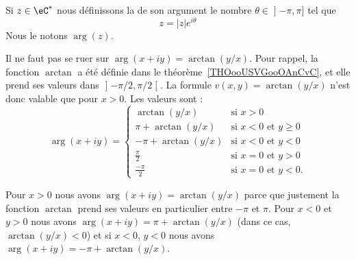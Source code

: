 \begin{definition}
	Si \( z\in \eC^*\) nous définissons la  de son argument le nombre \( \theta\in \mathopen] -\pi , \pi \mathclose]\) tel que
	\begin{equation}
		z=| z | e^{i\theta}
	\end{equation}
	Nous le notons \( \arg(z)\).
\end{definition}

\begin{normaltext}      \label{NORMooOGHNooYriCBH}
	Il ne faut pas se ruer sur \( \arg(x+iy)=\arctan(y/x)\). Pour rappel, la fonction \( \arctan\) a été définie dans le théorème~\ref{THOooUSVGooOAnCvC}, et elle prend ses valeurs dans \( \mathopen] -\pi/2 , \pi/2 \mathclose[\). La formule \( v(x,y)=\arctan(y/x)\) n'est donc valable que pour \( x>0\). Les valeurs sont :
	\begin{equation}        \label{EQooPJVFooSEKTny}
		\arg(x+iy)=\begin{cases}
			\arctan(y/x)       & \text{si } x>0                   \\
			\pi+\arctan(y/x)   & \text{si } x<0\text{ et }y\geq 0 \\
			-\pi+\arctan(y/x)  & \text{si } x<0 \text{ et }y<0    \\
			\frac{ \pi }{ 2 }  & \text{si } x=0 \text{ et }y>0    \\
			\frac{- \pi }{ 2 } & \text{si } x=0 \text{ et }y<0.
		\end{cases}
	\end{equation}

	Pour \( x>0\) nous avons \( \arg(x+iy)=\arctan(y/x)  \) parce que justement la fonction \( \arctan\) prend ses valeurs en particulier entre \( -\pi\) et \( \pi\). Pour \( x<0\) et \( y>0 \) nous avons \( \arg(x+iy)=\pi+\arctan(y/x)\) (dans ce cas, \( \arctan(y/x)<0\)) et si \( x<0\), \( y<0\) nous avons \( \arg(x+iy)=-\pi+\arctan(y/x)\).
\end{normaltext}

